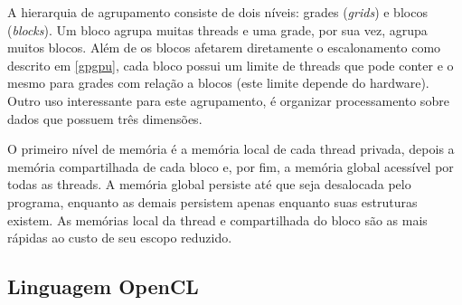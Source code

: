   A hierarquia de agrupamento consiste de dois níveis: grades (\textit{grids}) e blocos (\textit{blocks}). Um bloco agrupa muitas threads e uma grade, por sua vez, agrupa muitos blocos. Além de os blocos afetarem diretamente o escalonamento como descrito em \ref{gpgpu}, cada bloco possui um limite de threads que pode conter e o mesmo para grades com relação a blocos (este limite depende do hardware). Outro uso interessante para este agrupamento, é organizar processamento sobre dados que possuem três dimensões.
  
  O primeiro nível de memória é a memória local de cada thread privada, depois a memória compartilhada de cada bloco e, por fim, a memória global acessível por todas as threads. A memória global persiste até que seja desalocada pelo programa, enquanto as demais persistem apenas enquanto suas estruturas existem. As memórias local da thread e compartilhada do bloco são as mais rápidas ao custo de seu escopo reduzido.
    
  \subsection{Linguagem OpenCL}
